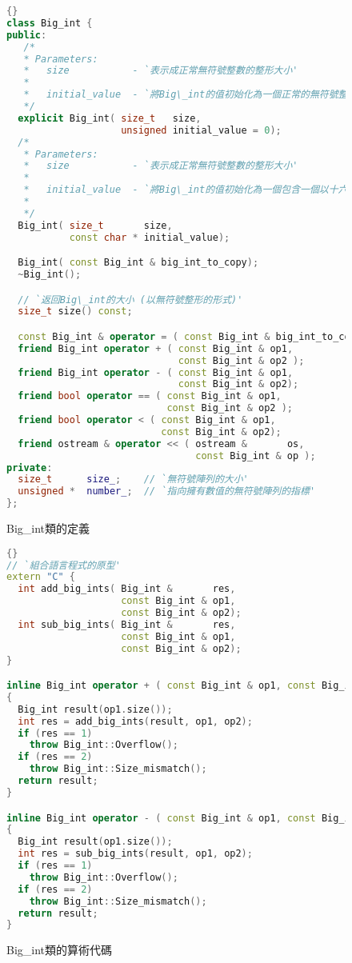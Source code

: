 \begin{figure}[tp]
\lstset{escapeinside=`',language=Pascal,%
}
\begin{lstlisting}[frame=tlrb,language=C++]{}
class Big_int {
public:
   /*
   * Parameters:
   *   size           - `表示成正常無符號整數的整形大小'
   *
   *   initial_value  - `將Big\_int的值初始化為一個正常的無符號整形'
   */
  explicit Big_int( size_t   size,
                    unsigned initial_value = 0);
  /*
   * Parameters:
   *   size           - `表示成正常無符號整數的整形大小'
   *
   *   initial_value  - `將Big\_int的值初始化為一個包含一個以十六進位表示的值的字串'
   *
   */
  Big_int( size_t       size,
           const char * initial_value);

  Big_int( const Big_int & big_int_to_copy);
  ~Big_int();

  // `返回Big\_int的大小 (以無符號整形的形式)'
  size_t size() const;

  const Big_int & operator = ( const Big_int & big_int_to_copy);
  friend Big_int operator + ( const Big_int & op1,
                              const Big_int & op2 );
  friend Big_int operator - ( const Big_int & op1,
                              const Big_int & op2);
  friend bool operator == ( const Big_int & op1,
                            const Big_int & op2 );
  friend bool operator < ( const Big_int & op1,
                           const Big_int & op2);
  friend ostream & operator << ( ostream &       os,
                                 const Big_int & op );
private:
  size_t      size_;    // `無符號陣列的大小'
  unsigned *  number_;  // `指向擁有數值的無符號陣列的指標'
};
\end{lstlisting}
\caption{Big\_int類的定義\label{fig:BigIntClass}}
\end{figure}

\begin{figure}[tp]
\lstset{escapeinside=`',language=Pascal,%
}
\begin{lstlisting}[frame=tlrb,language=C++]{}
// `組合語言程式的原型'
extern "C" {
  int add_big_ints( Big_int &       res,
                    const Big_int & op1,
                    const Big_int & op2);
  int sub_big_ints( Big_int &       res,
                    const Big_int & op1,
                    const Big_int & op2);
}

inline Big_int operator + ( const Big_int & op1, const Big_int & op2)
{
  Big_int result(op1.size());
  int res = add_big_ints(result, op1, op2);
  if (res == 1)
    throw Big_int::Overflow();
  if (res == 2)
    throw Big_int::Size_mismatch();
  return result;
}

inline Big_int operator - ( const Big_int & op1, const Big_int & op2)
{
  Big_int result(op1.size());
  int res = sub_big_ints(result, op1, op2);
  if (res == 1)
    throw Big_int::Overflow();
  if (res == 2)
    throw Big_int::Size_mismatch();
  return result;
}
\end{lstlisting}
\caption{Big\_int類的算術代碼\label{fig:BigIntAdd}}
\end{figure}

